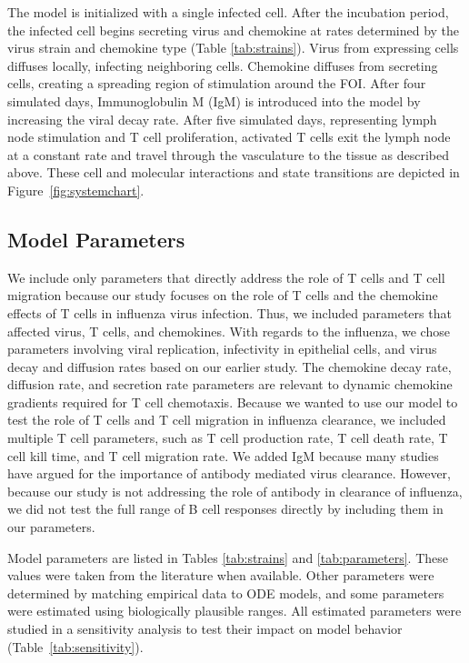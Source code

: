 \documentclass[preprint,10pt,numbers]{elsarticle}
\begin{document}
The model is initialized with a single infected cell.  After the incubation period, the infected cell begins secreting virus and chemokine at rates determined by the virus strain and chemokine type (Table \ref{tab:strains}).  Virus from expressing cells diffuses locally, infecting neighboring cells. Chemokine diffuses from secreting cells, creating a spreading region of stimulation around the FOI. After four simulated days, Immunoglobulin M (IgM) is introduced into the model by increasing the viral decay rate.  After five simulated days, representing lymph node stimulation and T cell proliferation, activated T cells exit the lymph node at a constant rate and travel through the vasculature to the tissue as described above.  These cell and molecular interactions and state transitions are depicted in Figure~\ref{fig:systemchart}.

\subsection*{Model Parameters}

We include only parameters that directly address the role of T cells and T cell migration because our study focuses on the role of T cells and the chemokine effects of T cells in influenza virus infection. Thus, we included parameters that affected virus, T cells, and chemokines. With regards to the influenza, we chose parameters involving viral replication, infectivity in epithelial cells, and virus decay and diffusion rates based on our earlier study.  The chemokine decay rate, diffusion rate, and secretion rate parameters are relevant to dynamic chemokine gradients required for T cell chemotaxis.  Because we wanted to use our model to test the role of T cells and T cell migration in influenza clearance, we included multiple T cell parameters, such as T cell production rate, T cell death rate, T cell kill time, and T cell migration rate.  We added IgM because many studies have argued for the importance of antibody mediated virus clearance. However, because our study is not addressing the role of antibody in clearance of influenza, we did not test the full range of B cell responses directly by including them in our parameters.

Model parameters are listed in Tables \ref{tab:strains} and \ref{tab:parameters}. These values were taken from the literature when available.  Other parameters were determined by matching empirical data to ODE models, and some parameters were estimated using biologically plausible ranges.  All estimated parameters were studied in a sensitivity analysis to test their impact on model behavior (Table~\ref{tab:sensitivity}). 
\end{document}
